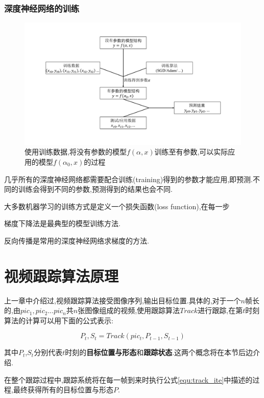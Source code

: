 \subsubsection{深度神经网络的训练}
\par
\begin{figure}[htbp!]
    \centering
    \includegraphics[width = 1.\textwidth]{chap/img/model_learning.pdf}
    \caption{使用训练数据,将没有参数的模型$f(\alpha,x)$训练至有参数,可以实际应用的模型$f(\alpha_0,x)$的过程}
    \label{fig:model_learning}
\end{figure}
几乎所有的深度神经网络都需要配合训练(training)得到的参数才能应用,即预测.不同的训练会得到不同的参数,预测得到的结果也会不同.
\par
大多数机器学习的训练方式是定义一个损失函数(loss function),在每一步
\par
梯度下降法是最典型的模型训练方法.
\par
反向传播是常用的深度神经网络求梯度的方法.

\section{视频跟踪算法原理}
上一章中介绍过,视频跟踪算法接受图像序列,输出目标位置.具体的,对于一个$n$帧长的,由$pic_1,pic_2...pic_n$共$n$张图像组成的视频,使用跟踪算法$Track$进行跟踪,在第$t$时刻算法的计算可以用下面的公式表示:
\par
\begin{equation}\label{equ:track_ite}  P_t,S_t=Track(pic_{t},P_{t-1},S_{t-1})  \end{equation}
\par
其中$P_t$,$S_t$分别代表$t$时刻的\textbf{目标位置与形态}和\textbf{跟踪状态}.这两个概念将在本节后边介绍.
\par
在整个跟踪过程中,跟踪系统将在每一帧到来时执行公式\ref{equ:track_ite}中描述的过程,最终获得所有的目标位置与形态$P$.
\par
